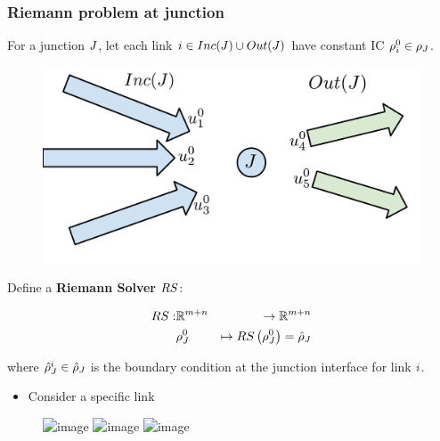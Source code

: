 \begin{frame}
\frametitle{Riemann problem at junction}

For a junction $J$, let each link $i \in Inc(J)\cup Out(J)$ have constant IC $\rho_{i}^0\in \mathbf{\rho}_{J}$.

\begin{figure}
\includegraphics[width=.7\columnwidth]{figs-gen/junctions-riemann}
\end{figure}

\end{frame}

\begin{frame}

Define a \textbf{Riemann Solver} $RS$:

\begin{align}
RS:&\mathbb{R}^{m+n}&\rightarrow\mathbb{R}^{m+n}\\&\mathbf{\rho}_{J}^{0}&\mapsto RS\left(\mathbf{\rho}_{J}^{0}\right)=\hat{\mathbf{\rho}}_{J}
\end{align}

where $\hat{\rho}^{i}_{J} \in \hat{\mathbf{\rho}}_{J}$ is the boundary condition at the junction interface for link $i$.

\begin{itemize}
    \item<2-3> Consider a specific link
\end{itemize}

\begin{figure}
\includegraphics<1>[width=.7\columnwidth]{figs-gen/junctions-riemann-rs}
\includegraphics<2>[width=.7\columnwidth]{figs-gen/junctions-riemann-rs-one}
\includegraphics<3>[width=.7\columnwidth]{figs-gen/riemann-junction}
\end{figure}

\end{frame}

